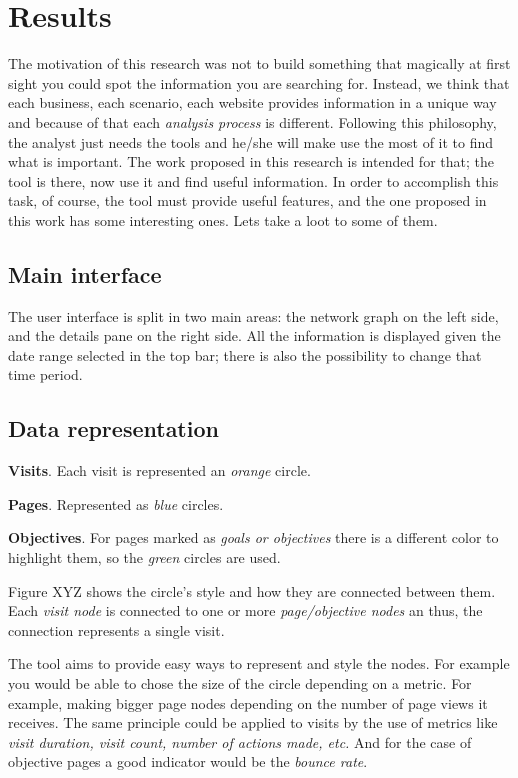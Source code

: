 \documentclass[preprint,12pt,3p]{elsarticle}
\begin{document}
\section{Results}
\label{sec:results}
The motivation of this research was not to build something that magically at first sight you could spot the information you are searching for. Instead, we think that each business, each scenario, each website provides information in a unique way and because of that each \textit{analysis process} is different. Following this philosophy, the analyst just needs the tools and he/she will make use the most of it to find what is important. The work proposed in this research is intended for that; the tool is there, now use it and find useful information.
In order to accomplish this task, of course, the tool must provide useful features, and the one proposed in this work has some interesting ones. Lets take a loot to some of them.


\subsection{Main interface}
The user interface is split in two main areas: the network graph on the left side, and the details pane on the right side.
All the information is displayed given the date range selected in the top bar; there is also the possibility to change that time period.

\subsection{Data representation}
\textbf{Visits}. Each visit is represented an \textit{orange} circle.

\textbf{Pages}. Represented as \textit{blue} circles.

\textbf{Objectives}. For pages marked as \textit{goals or objectives} there is a different color to highlight them, so the \textit{green} circles are used.

Figure XYZ shows the circle's style and how they are connected between them. Each \textit{visit node} is connected to one or more \textit{page/objective nodes} an thus, the connection represents a single visit.

The tool aims to provide easy ways to represent and style the nodes. For example you would be able to chose the size of the circle depending on a metric. For example, making bigger page nodes depending on the number of page views it receives.
The same principle could be applied to visits by the use of metrics like \textit{visit duration, visit count, number of actions made, etc.} And for the case of objective pages a good indicator would be the \textit{bounce rate}.
\end{document}
